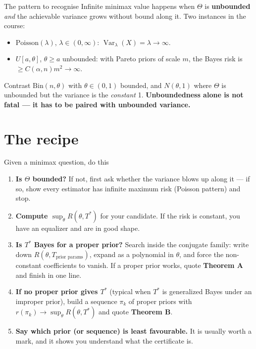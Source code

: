 \documentclass[11pt]{article}
\newcommand{\Var}{\operatorname{Var}}
\begin{document}
\begin{idea}{The pattern to recognise}
Infinite minimax value happens when $\Theta$ is \textbf{unbounded} \emph{and} the achievable
variance grows without bound along it. Two instances in the course:
\begin{itemize}
\item $\mathrm{Poisson}(\lambda)$, $\lambda\in(0,\infty)$: $\Var_\lambda(X)=\lambda\to\infty$.
\item $U[a,\theta]$, $\theta\ge a$ unbounded: with Pareto priors of scale $m$, the Bayes risk
is $\ge C(\alpha,n)m^{2}\to\infty$.
\end{itemize}
Contrast $\mathrm{Bin}(n,\theta)$ with $\theta\in(0,1)$ bounded, and $N(\theta,1)$ where
$\Theta$ is unbounded but the variance is the \emph{constant} 1. \textbf{Unboundedness alone is
not fatal --- it has to be paired with unbounded variance.}
\end{idea}

\section{The recipe}

\begin{recipe}{Given a minimax question, do this}
\begin{enumerate}
\item \textbf{Is $\Theta$ bounded?} If not, first ask whether the variance blows up along it
--- if so, show every estimator has infinite maximum risk (Poisson pattern) and stop.
\item \textbf{Compute $\sup_\theta R(\theta,T^*)$} for your candidate. If the risk is constant,
you have an equalizer and are in good shape.
\item \textbf{Is $T^*$ Bayes for a proper prior?} Search inside the conjugate family: write
down $R(\theta,T_{\text{prior params}})$, expand as a polynomial in $\theta$, and force the
non-constant coefficients to vanish. If a proper prior works, quote \textbf{Theorem A} and
finish in one line.
\item \textbf{If no proper prior gives $T^*$} (typical when $T^*$ is generalized Bayes under an
improper prior), build a sequence $\pi_k$ of proper priors with $r(\pi_k)\to\sup_\theta
R(\theta,T^*)$ and quote \textbf{Theorem B}.
\item \textbf{Say which prior (or sequence) is least favourable.} It is usually worth a mark,
and it shows you understand what the certificate is.
\end{enumerate}
\end{recipe}
\end{document}
